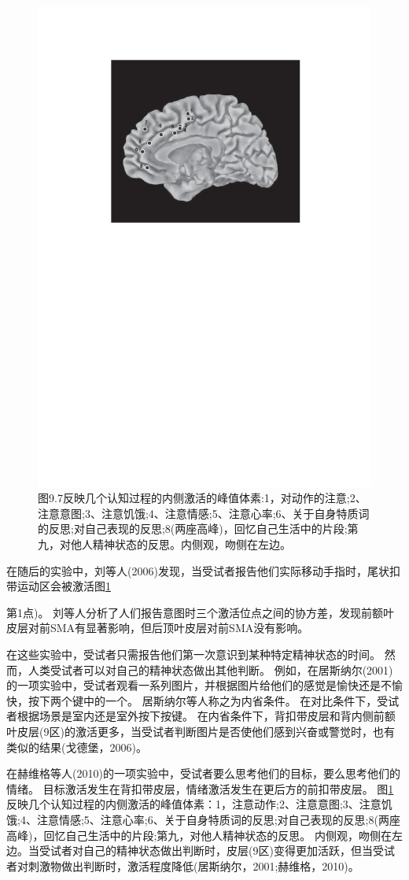 \begin{figure}[!htb]
	\centering
	\includegraphics[width=0.5\linewidth]{chap9/9_7}
	\caption{图9.7反映几个认知过程的内侧激活的峰值体素:1，对动作的注意;2、注意意图;3、注意饥饿;4、注意情感;5、注意心率;6、关于自身特质词的反思;对自己表现的反思;8(两座高峰)，回忆自己生活中的片段;第九，对他人精神状态的反思。内侧观，吻侧在左边。\label{fig:fig_9_7}}
\end{figure}

\par


在随后的实验中，刘等人(2006)发现，当受试者报告他们实际移动手指时，尾状扣带运动区会被激活图\ref{fig:fig_9_7}

第1点)。
刘等人分析了人们报告意图时三个激活位点之间的协方差，发现前额叶皮层对前SMA有显著影响，但后顶叶皮层对前SMA没有影响。
\par


在这些实验中，受试者只需报告他们第一次意识到某种特定精神状态的时间。
然而，人类受试者可以对自己的精神状态做出其他判断。
例如，在居斯纳尔(2001)的一项实验中，受试者观看一系列图片，并根据图片给他们的感觉是愉快还是不愉快，按下两个键中的一个。
居斯纳尔等人称之为内省条件。
在对比条件下，受试者根据场景是室内还是室外按下按键。
在内省条件下，背扣带皮层和背内侧前额叶皮层(9区)的激活更多，当受试者判断图片是否使他们感到兴奋或警觉时，也有类似的结果(戈德堡，2006)。
\par


在赫维格等人(2010)的一项实验中，受试者要么思考他们的目标，要么思考他们的情绪。
目标激活发生在背扣带皮层，情绪激活发生在更后方的前扣带皮层。
图\ref{fig:fig_9_7}反映几个认知过程的内侧激活的峰值体素：1，注意动作;2、注意意图;3、注意饥饿;4、注意情感;5、注意心率;6、关于自身特质词的反思;对自己表现的反思;8(两座高峰)，回忆自己生活中的片段;第九，对他人精神状态的反思。
内侧观，吻侧在左边。当受试者对自己的精神状态做出判断时，皮层(9区)变得更加活跃，但当受试者对刺激物做出判断时，激活程度降低(居斯纳尔，2001;赫维格，2010)。



